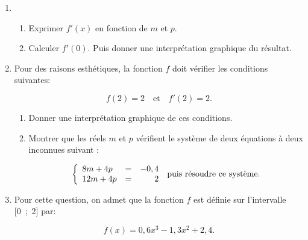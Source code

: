 \documentclass[10pt]{article}
\begin{document}
\begin{enumerate}
\item 
	\begin{enumerate}
		\item Exprimer $f'(x)$ en fonction de $m$ et $p$. 
		\item Calculer $f'(0)$. Puis donner une interprétation graphique du résultat.
	\end{enumerate}
\item Pour des raisons esthétiques, la fonction $f$ doit vérifier les conditions suivantes: 

\[ f(2) = 2  \quad \text{et} \quad  f'(2) = 2.\]

	\begin{enumerate}
		\item Donner une interprétation graphique de ces conditions. 
		\item Montrer que les réels $m$ et $p$ vérifient le système de deux équations à deux inconnues suivant : 

\[\left\{\begin{array}{l c r}
8m + 4p &=& -0,4\\ 
12m + 4p &=& 2
\end{array}\right. \: \text{puis résoudre ce système.}\]
	\end{enumerate} 
\item  Pour cette question, on admet que la fonction $f$ est définie sur l'intervalle [0~;~2] par: 

\[f(x) = 0,6x^3 - 1,3x^2 + 2,4.\] 


\end{enumerate}
\end{document}
